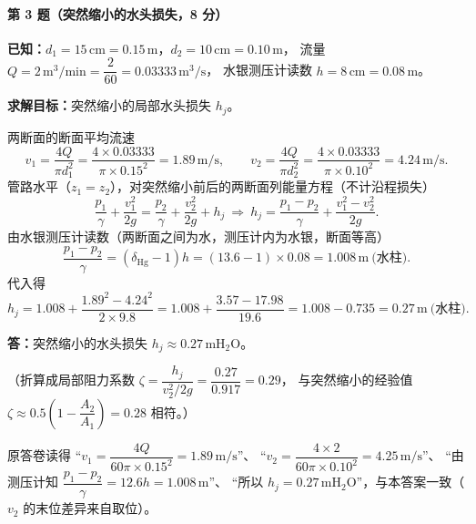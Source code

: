 \paragraph{第 3 题（突然缩小的水头损失，8 分）}
\begin{jie}
\textbf{已知：}$d_1=15\,\mathrm{cm}=0.15\,\mathrm{m}$，$d_2=10\,\mathrm{cm}=0.10\,\mathrm{m}$，
流量 $Q=2\,\mathrm{m^{3}/min}=\dfrac{2}{60}=0.03333\,\mathrm{m^{3}/s}$，
水银测压计读数 $h=8\,\mathrm{cm}=0.08\,\mathrm{m}$。

\textbf{求解目标：}突然缩小的局部水头损失 $h_j$。

两断面的断面平均流速
\[
v_1=\frac{4Q}{\pi d_1^{2}}=\frac{4\times0.03333}{\pi\times0.15^{2}}=1.89\,\mathrm{m/s},
\qquad
v_2=\frac{4Q}{\pi d_2^{2}}=\frac{4\times0.03333}{\pi\times0.10^{2}}=4.24\,\mathrm{m/s}.
\]
管路水平（$z_1=z_2$），对突然缩小前后的两断面列能量方程（不计沿程损失）
\[
\frac{p_1}{\gamma}+\frac{v_1^{2}}{2g}
=\frac{p_2}{\gamma}+\frac{v_2^{2}}{2g}+h_j
\ \Longrightarrow\
h_j=\frac{p_1-p_2}{\gamma}+\frac{v_1^{2}-v_2^{2}}{2g}.
\]
由水银测压计读数（两断面之间为水，测压计内为水银，断面等高）
\[
\frac{p_1-p_2}{\gamma}=(\delta_{\mathrm{Hg}}-1)h=(13.6-1)\times0.08=1.008\,\mathrm{m}\ \text{(水柱)} .
\]
代入得
\[
h_j=1.008+\frac{1.89^{2}-4.24^{2}}{2\times9.8}
=1.008+\frac{3.57-17.98}{19.6}
=1.008-0.735=0.27\,\mathrm{m}\ \text{(水柱)} .
\]

\textbf{答：}突然缩小的水头损失 $h_j\approx0.27\,\mathrm{mH_2O}$。

（折算成局部阻力系数 $\zeta=\dfrac{h_j}{v_2^{2}/2g}=\dfrac{0.27}{0.917}=0.29$，
与突然缩小的经验值 $\zeta\approx0.5\left(1-\dfrac{A_2}{A_1}\right)=0.28$ 相符。）
\end{jie}

\begin{tishi}
原答卷读得 ``$v_1=\dfrac{4Q}{60\pi\times0.15^{2}}=1.89\,\mathrm{m/s}$''、
``$v_2=\dfrac{4\times2}{60\pi\times0.10^{2}}=4.25\,\mathrm{m/s}$''、
``由测压计知 $\dfrac{p_1-p_2}{\gamma}=12.6h=1.008\,\mathrm{m}$''、
``所以 $h_j=0.27\,\mathrm{mH_2O}$''，与本答案一致（$v_2$ 的末位差异来自取位）。
\end{tishi}

